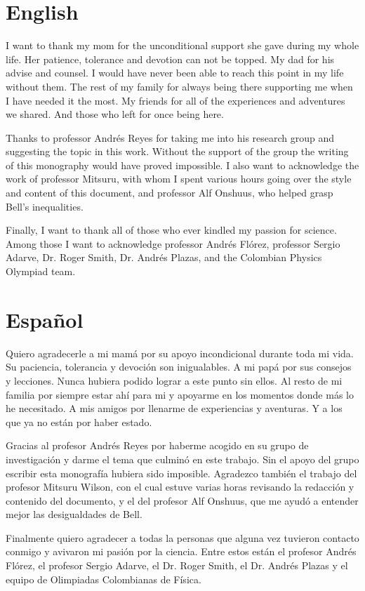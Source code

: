 \documentclass[12pt]{report}
\theoremstyle{definition}
\begin{document}
\section*{English}

I want to thank my mom for the unconditional support she gave during my whole life. Her patience, tolerance and devotion can not be topped. My dad for his advise and counsel. I would have never been able to reach this point in my life without them. The rest of my family for always being there supporting me when I have needed it the most. My friends for all of the experiences and adventures we shared. And those who left for once being here.

Thanks to professor Andrés Reyes for taking me into his research group and suggesting the topic in this work. Without the support of the group the writing of this monography would have proved impossible. I also want to acknowledge the work of professor Mitsuru, with whom I spent various hours going over the style and content of this document, and professor Alf Onshuus, who helped grasp Bell's inequalities.

Finally, I want to thank all of those who ever kindled my passion for science. Among those I want to acknowledge professor Andrés Flórez, professor Sergio Adarve, Dr. Roger Smith, Dr. Andrés Plazas, and the Colombian Physics Olympiad team. 

\section*{Español}

Quiero agradecerle a mi mamá por su apoyo incondicional durante toda mi vida. Su paciencia, tolerancia y devoción son inigualables. A mi papá por sus consejos y lecciones. Nunca hubiera podido lograr a este punto sin ellos. Al resto de mi familia por siempre estar ahí para mi y apoyarme en los momentos donde más lo he necesitado. A mis amigos por llenarme de experiencias y aventuras. Y a los que ya no están por haber estado.

Gracias al profesor Andrés Reyes por haberme acogido en su grupo de investigación y darme el tema que culminó en este trabajo. Sin el apoyo del grupo escribir esta monografía hubiera sido imposible. Agradezco también el trabajo del profesor Mitsuru Wilson, con el cual estuve varias horas revisando la redacción y contenido del documento, y el del profesor Alf Onshuus, que me ayudó a entender mejor las desigualdades de Bell.

Finalmente quiero agradecer a todas la personas que alguna vez tuvieron contacto conmigo y avivaron mi pasión por la ciencia. Entre estos están el profesor Andrés Flórez, el profesor Sergio Adarve, el Dr. Roger Smith, el Dr. Andrés Plazas y el equipo de Olimpiadas Colombianas de Física. 
\end{document}
